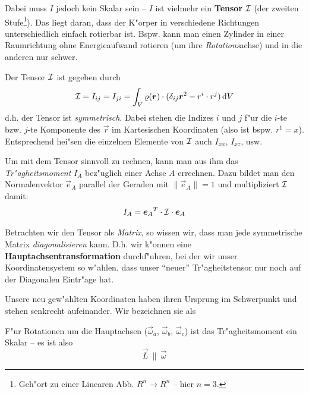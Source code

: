 Dabei muss $I$ jedoch kein Skalar sein -- $I$ ist vielmehr ein
\textbf{Tensor} ${\mathcal{I}}$ (der zweiten Stufe\footnote{Geh"ort zu einer
  Linearen Abb. $R^n \to R^n$ -- hier $n = 3$.}). Das liegt daran, dass der
K"orper in verschiedene
Richtungen unterschiedlich einfach rotierbar ist.
Bspw. kann man einen Zylinder in einer Raumrichtung ohne
Energieaufwand rotieren (um ihre \emph{Rotations}achse) und in die
anderen nur schwer.

Der Tensor ${\mathcal{I}}$ ist gegeben durch
\begin{equation}
   \label{eqn_traegheitstensor}
   {\mathcal{I}} = I_{ij} = I_{ji} = \int_V \varrho(\boldsymbol{r}) \cdot (
   \delta_{ij}\boldsymbol{r}^2 - r^i \cdot r^j ) \, \mathrm{d} V
\end{equation}
d.h. der Tensor ist \emph{symmetrisch}. Dabei stehen die Indizes $i$
und $j$ f"ur die $i$-te bzw. $j$-te Komponente des $\vec r$ im
Kartesischen Koordinaten (also ist bspw. $r^1 = x$). Entsprechend
hei"sen die einzelnen Elemente von ${\mathcal{I}}$ auch $I_{xx}$, $ I_{xz}$, usw.

Um mit dem Tensor sinnvoll zu rechnen, kann man aus ihm das
\emph{Tr"agheitsmoment} $I_A$ bez"uglich einer Achse $A$ errechnen. Dazu
bildet man den Normalenvektor $\vec e_A$ parallel der Geraden mit
$\|\vec e_A\| = 1$ und multipliziert ${\mathcal{I}}$ damit:
\begin{equation}
   \label{eq:44}
   I_A = {\boldsymbol{e}_A}^{T} \cdot  {\mathcal{I}} \cdot \boldsymbol{e}_A
\end{equation}

\abs
Betrachten wir den Tensor als \emph{Matrix}, so wissen wir, dass man
jede symmetrische Matrix \emph{diagonalisieren} kann. D.h. wir k"onnen
eine \textbf{Hauptachsentransformation} durchf"uhren, bei der wir unser
Koordinatensystem so w"ahlen, dass unser "`neuer"' Tr"agheitstensor nur
noch auf der Diagonalen Eintr"age hat.

Unsere neu gew"ahlten Koordinaten haben ihren Ursprung im Schwerpunkt
und stehen senkrecht aufeinander. Wir bezeichnen sie als 
\begin{Def}
F"ur Rotationen um die Hauptachsen ($\vec \omega_a$, $\vec \omega_b$,
$\vec \omega_c$) ist das Tr"agheitsmoment ein Skalar
-- es ist also 
$$\vec L  ~ \| ~ \vec \omega$$
\end{Def}

